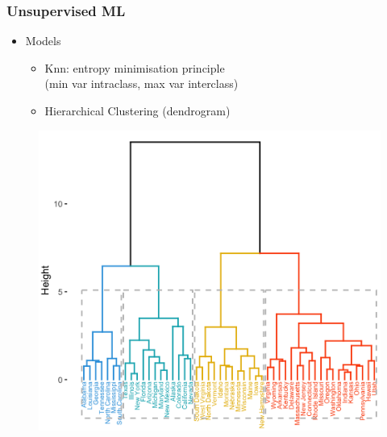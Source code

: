 \begin{frame}\frametitle{Unsupervised ML}
   \begin{itemize}
      \item Models
      \begin{itemize}
         \item Knn: entropy minimisation principle\\
         (min var intraclass, max var interclass)
         \item Hierarchical Clustering (dendrogram)
      \end{itemize}
   \end{itemize}
   \begin{figure}[H]
      \includegraphics[scale=.18]{../images/illustrations/model_hierarchical_clustering.png}
   \end{figure}

\end{frame}


